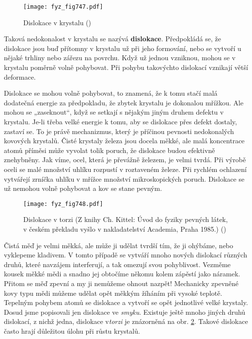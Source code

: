     \begin{figure}[ht!] %
      \centering
      \texttt{[image: fyz\_fig747.pdf]}
      \caption{Dislokace v krystalu
               (\cite[s.~554]{Feynman02})}
      \label{fyz_fig747}
    \end{figure}

    Taková nedokonalost v krystalu se nazývá \textbf{dislokace}. Předpokládá se, že dislokace jsou 
    buď přítomny v krystalu už při jeho formování, nebo se vytvoří u nějaké trhliny nebo zářezu na 
    povrchu. Když už jednou vzniknou, mohou se v krystalu poměrně volně pohybovat. Při pohybu 
    takovýchto dislokací vznikají větší deformace.
    
    Dislokace se mohou volně pohybovat, to znamená, že k tomu stačí malá dodatečná energie za 
    předpokladu, že zbytek krystalu je dokonalou mřížkou. Ale mohou se „zaseknout“, když se setkají 
    s nějakým jiným druhem defektu v krystalu. Je-li třeba velké energie k tomu, aby se dislokace 
    přes defekt dostaly, zastaví se. To je právě mechanizmus, který je příčinou pevnosti 
    nedokonalých kovových krystalů. Čisté krystaly železa jsou docela měkké, ale malá koncentrace 
    atomů příměsi může vyvolat tolik poruch, že dislokace budou efektivně znehybněny. Jak víme, 
    ocel, která je převážně železem, je velmi tvrdá. Při výrobě oceli se malé množství uhlíku 
    rozpustí v roztaveném železe. Při rychlém ochlazení vytvářejí zrníčka uhlíku v mřížce množství 
    mikroskopických poruch. Dislokace se už nemohou volně pohybovat a kov se stane pevným.
    
    \begin{figure}[ht!] %
      \centering
      \texttt{[image: fyz\_fig748.pdf]}
      \caption{Dislokace v torzi (Z knihy Ch. Kittel: Úvod do fyziky pevných látek, v českém 
               překladu vyšlo v nakladatelství Academia, Praha 1985.)
               (\cite[s.~554]{Feynman02})}
      \label{fyz_fig748}
    \end{figure}
    
    Čistá měď je velmi měkká, ale může ji udělat tvrdší tím, že ji ohýbáme, nebo vyklepeme 
    kladivem. V tomto případě se vytváří mnoho nových dislokací různých druhů, které navzájem 
    interferují, a tak omezují svou pohyblivost. Vezměme kousek měkké mědi a snadno jej obtočíme 
    někomu kolem zápěstí jako náramek. Přitom se měď zpevní a my ji nemůžeme ohnout nazpět! 
    Mechanicky zpevněné kovy typu mědi můžeme udělat opět měkkým žíháním při vysoké teplotě. 
    Tepelným pohybem atomů se  dislokace a vytvoří se opět jednotlivé velké krystaly. 
    Dosud jsme popisovali jen dislokace ve \emph{smyku}. Existuje ještě mnoho jiných druhů 
    dislokací, z nichž jedna, dislokace v\emph{torzi} je znázorněná na obr. \ref{fyz_fig748}. 
    Takové dislokace často hrají důležitou úlohu při růstu krystalů. 
    
